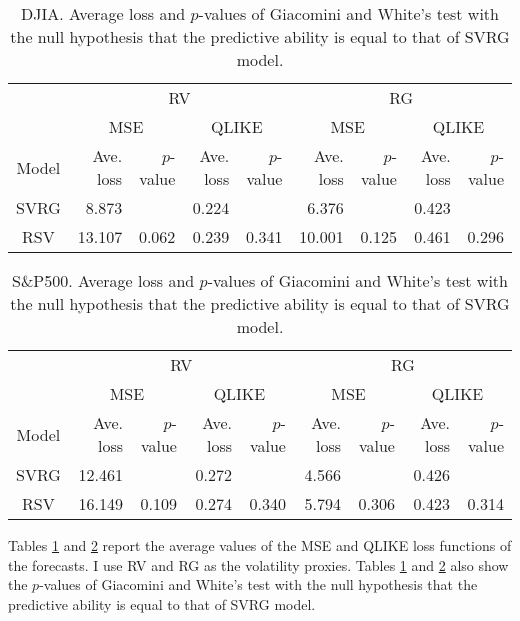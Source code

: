\documentclass[11pt]{article}
\begin{document}
\begin{table} [H]
\caption{DJIA. Average loss and $p$-values of Giacomini and White's test with the null hypothesis that the predictive ability is equal to that of SVRG model. \label{table:empirical2}} 
\begin{center}
\begin{tabular}{crrrrrrrr} \hline
\multicolumn{1}{c}{} & \multicolumn{4}{c}{RV} & \multicolumn{4}{c}{RG} \\ 
\multicolumn{1}{c}{} & \multicolumn{2}{c}{MSE} & \multicolumn{2}{c}{QLIKE} & \multicolumn{2}{c}{MSE} & \multicolumn{2}{c}{QLIKE} \\ 
Model & Ave. loss & $p$-value & Ave. loss & $p$-value & Ave. loss & $p$-value & Ave. loss & $p$-value  \\ \hline
SVRG & 8.873 & & 0.224 & & 6.376 & & 0.423 & \\
RSV & 13.107 & 0.062 & 0.239 & 0.341 & 10.001 & 0.125 & 0.461 & 0.296 \\
\hline
\end{tabular}
\end{center}
\end{table}

\begin{table} [H]
\caption{S\&P500. Average loss and $p$-values of Giacomini and White's test with the null hypothesis that the predictive ability is equal to that of SVRG model. \label{table:empirical3}} 
\begin{center}
\begin{tabular}{crrrrrrrr} \hline
\multicolumn{1}{c}{} & \multicolumn{4}{c}{RV} & \multicolumn{4}{c}{RG} \\ 
\multicolumn{1}{c}{} & \multicolumn{2}{c}{MSE} & \multicolumn{2}{c}{QLIKE} & \multicolumn{2}{c}{MSE} & \multicolumn{2}{c}{QLIKE} \\ 
Model & Ave. loss & $p$-value & Ave. loss & $p$-value & Ave. loss & $p$-value & Ave. loss & $p$-value  \\ \hline
SVRG & 12.461 & & 0.272 & & 4.566 & & 0.426 & \\
RSV & 16.149 & 0.109 & 0.274 & 0.340 & 5.794 & 0.306 & 0.423 & 0.314 \\
\hline
\end{tabular}
\end{center}
\end{table}

Tables \ref{table:empirical2} and \ref{table:empirical3} report the average values of the MSE and QLIKE loss functions of the forecasts. 
I use RV and RG as the volatility proxies. 
Tables \ref{table:empirical2} and \ref{table:empirical3} also show the $p$-values of Giacomini and White's test with the null hypothesis that the predictive ability is equal to that of SVRG model. 
\end{document}
